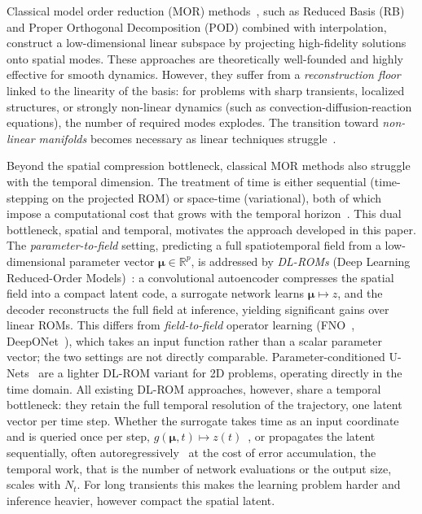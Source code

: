﻿\documentclass[a4paper,12pt]{article}
\theoremstyle{definition}
\theoremstyle{remark}
\newcommand{\vmu}{\bm{\mu}}
\newcommand{\R}{\mathbb{R}}
\begin{document}
Classical model order reduction (MOR) methods~\cite{hesthaven2015}, such as Reduced Basis (RB) and Proper Orthogonal Decomposition (POD) combined with interpolation, construct a low-dimensional linear subspace by projecting high-fidelity solutions onto spatial modes. These approaches are theoretically well-founded and highly effective for smooth dynamics. However, they suffer from a \emph{reconstruction floor} linked to the linearity of the basis: for problems with sharp transients, localized structures, or strongly non-linear dynamics (such as convection-diffusion-reaction equations), the number of required modes explodes. The transition toward \emph{non-linear manifolds} becomes necessary as linear techniques struggle~\cite{fresca2021}.

Beyond the spatial compression bottleneck, classical MOR methods also struggle with the temporal dimension. The treatment of time is either sequential (time-stepping on the projected ROM) or space-time (variational), both of which impose a computational cost that grows with the temporal horizon~\cite{glas2017,lassila2014,iliescu2025}. This dual bottleneck, spatial and temporal, motivates the approach developed in this paper.
The \emph{parameter-to-field} setting, predicting a full spatiotemporal field from a low-dimensional parameter vector $\vmu \in \R^p$, is addressed by \emph{DL-ROMs} (Deep Learning Reduced-Order Models)~\cite{lee2020,fresca2021,fresca2022}: a convolutional autoencoder compresses the spatial field into a compact latent code, a surrogate network learns $\vmu \mapsto z$, and the decoder reconstructs the full field at inference, yielding significant gains over linear ROMs. This differs from \emph{field-to-field} operator learning (FNO~\cite{li2021fno}, DeepONet~\cite{lu2021deeponet,lu2022pod}), which takes an input function rather than a scalar parameter vector; the two settings are not directly comparable. Parameter-conditioned U-Nets~\cite{kastor2026} are a lighter DL-ROM variant for 2D problems, operating directly in the time domain. All existing DL-ROM approaches, however, share a temporal bottleneck: they retain the full temporal resolution of the trajectory, one latent vector per time step. Whether the surrogate takes time as an input coordinate and is queried once per step, $g(\vmu, t) \mapsto z(t)$~\cite{fresca2021}, or propagates the latent sequentially, often autoregressively~\cite{pant2021deep} at the cost of error accumulation, the temporal work, that is the number of network evaluations or the output size, scales with $N_t$. For long transients this makes the learning problem harder and inference heavier, however compact the spatial latent.
\end{document}
